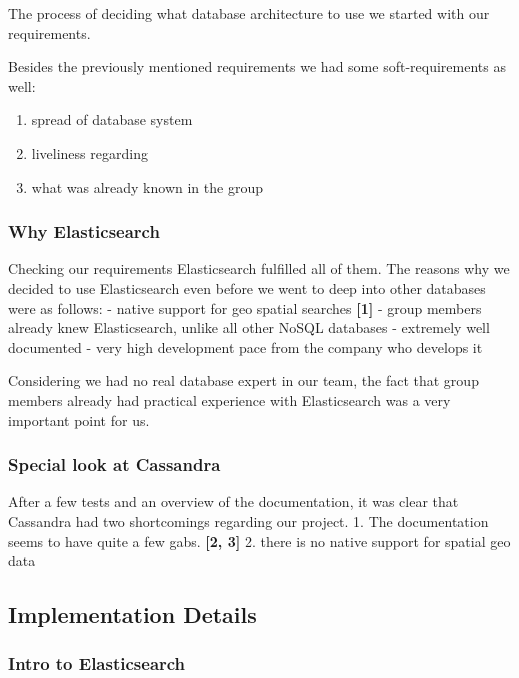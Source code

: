 The process of deciding what database architecture to use we started
with our requirements.

Besides the previously mentioned requirements we had some
soft-requirements as well:

\begin{enumerate}
\def\labelenumi{\arabic{enumi}.}
\tightlist
\item
  spread of database system
\item
  liveliness regarding
\item
  what was already known in the group
\end{enumerate}

\subsubsection{Why Elasticsearch}\label{why-elasticsearch}

Checking our requirements Elasticsearch fulfilled all of them. The
reasons why we decided to use Elasticsearch even before we went to deep
into other databases were as follows: - native support for geo spatial
searches \textbf{{[}1{]}} - group members already knew Elasticsearch,
unlike all other NoSQL databases - extremely well documented - very high
development pace from the company who develops it

Considering we had no real database expert in our team, the fact that
group members already had practical experience with Elasticsearch was a
very important point for us.

\subsubsection{Special look at
Cassandra}\label{special-look-at-cassandra}

After a few tests and an overview of the documentation, it was clear
that Cassandra had two shortcomings regarding our project. 1. The
documentation seems to have quite a few gabs. \textbf{{[}2, 3{]}} 2.
there is no native support for spatial geo data

\subsection{Implementation Details}\label{implementation-details}

\subsubsection{Intro to Elasticsearch}\label{intro-to-elasticsearch}


